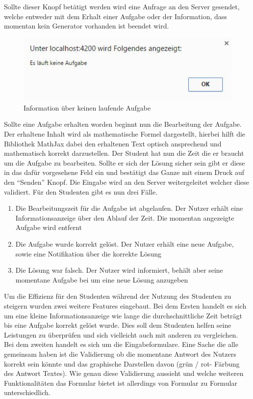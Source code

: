 Sollte dieser Knopf betätigt werden wird eine Anfrage an den Server gesendet, welche entweder mit dem Erhalt einer Aufgabe oder der Information, dass momentan kein Generator vorhanden ist beendet wird. \\

\begin{figure}[htp]     %
\centering
\includegraphics[width=1\textwidth]{bilder/NoTaskRunning} 
\caption[Information über keine laufende Aufgabe]{Information über keinen laufende Aufgabe}
\end{figure} 

Sollte eine Aufgabe erhalten worden beginnt nun die Bearbeitung der Aufgabe. Der erhaltene Inhalt wird als mathematische Formel dargestellt, hierbei hilft die Bibliothek MathJax dabei den erhaltenen Text optisch ansprechend und mathematisch korrekt darzustellen. Der Student hat nun die Zeit die er braucht um die Aufgabe zu bearbeiten. Sollte er sich der Lösung sicher sein gibt er diese in das dafür vorgesehene Feld ein und bestätigt das Ganze mit einem Druck auf den ``Senden'' Knopf. Die Eingabe wird an den Server weitergeleitet welcher diese validiert. Für den Studenten gibt es nun drei Fälle. \\
\begin{enumerate}
\item Die Bearbeitungszeit für die Aufgabe ist abgelaufen. Der Nutzer erhält eine Informationsanzeige über den Ablauf der Zeit. Die momentan angezeigte Aufgabe wird entfernt
\item Die Aufgabe wurde korrekt gelöst. Der Nutzer erhält eine neue Aufgabe, sowie eine Notifikation über die korrekte Lösung
\item Die Lösung war falsch. Der Nutzer wird informiert, behält aber seine momentane Aufgabe bei um eine neue Lösung anzugeben
\end{enumerate} 

Um die Effizienz für den Studenten während der Nutzung des Studenten zu steigern wurden zwei weitere Features eingebaut. Bei dem Ersten handelt es sich um eine kleine Informationsanzeige wie lange die durchschnittliche Zeit beträgt bis eine Aufgabe korrekt gelöst wurde. Dies soll dem Studenten helfen seine Leistungen zu überprüfen und sich vielleicht auch mit anderen zu vergleichen. \\
Bei dem zweiten handelt es sich um die Eingabeformulare. Eine Sache die alle gemeinsam haben ist die Validierung ob die momentane Antwort des Nutzers korrekt sein könnte und das graphische Darstellen davon (grün / rot- Färbung des Antwort Textes). Wie genau diese Validierung aussieht und welche weiteren Funktionalitäten das Formular bietet ist allerdings von Formular zu Formular unterschiedlich.

